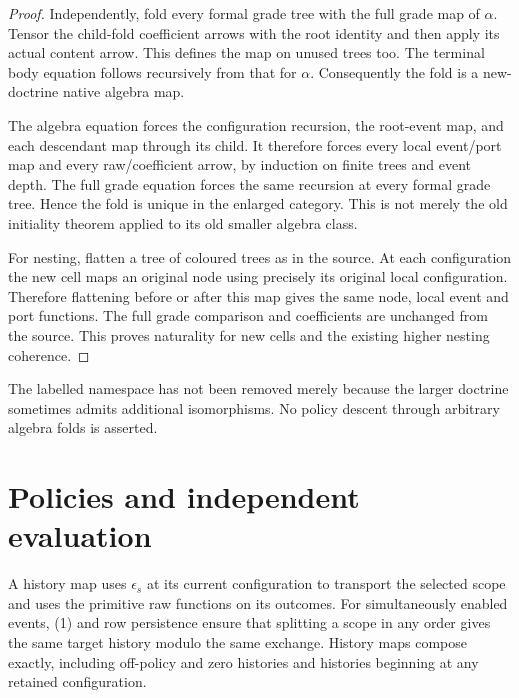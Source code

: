 \documentclass[11pt]{article}
\begin{document}
\begin{proof}
Independently, fold every formal grade tree with the full grade map of
$\alpha$. Tensor the child-fold coefficient arrows with the root identity
and then apply its actual content arrow. This defines the map on unused
trees too. The terminal body equation follows recursively from that for
$\alpha$. Consequently the fold is a new-doctrine native algebra map.

The algebra equation forces the configuration recursion, the root-event
map, and each descendant map through its child. It therefore forces every
local event/port map and every raw/coefficient arrow, by induction on finite
trees and event depth. The full grade equation forces the same recursion
at every formal grade tree. Hence the fold is unique in the enlarged
category. This is not merely the old initiality theorem applied to its old
smaller algebra class.

For nesting, flatten a tree of coloured trees as in the source. At each
configuration the new cell maps an original node using precisely its
original local configuration. Therefore flattening before or after this
map gives the same node, local event and port functions. The full grade
comparison and coefficients are unchanged from the source. This proves
naturality for new cells and the existing higher nesting coherence.
\end{proof}
The labelled namespace has not been removed merely because the larger
doctrine sometimes admits additional isomorphisms. No policy descent
through arbitrary algebra folds is asserted.

\section{Policies and independent evaluation}
A history map uses $\epsilon_s$ at its current configuration to transport
the selected scope and uses the primitive raw functions on its outcomes.
For simultaneously enabled events, (1) and row persistence ensure that
splitting a scope in any order gives the same target history modulo the
same exchange. History maps compose exactly, including off-policy and
zero histories and histories beginning at any retained configuration.
\end{document}
